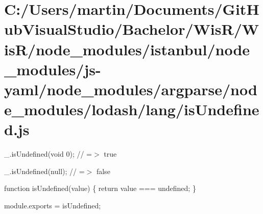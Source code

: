 \hypertarget{_c_1_2_users_2martin_2_documents_2_git_hub_visual_studio_2_bachelor_2_wis_r_2_wis_r_2node_module5b4f1dce1186bdc2e4e8148cbcdc9e7a}{}\section{C\+:/\+Users/martin/\+Documents/\+Git\+Hub\+Visual\+Studio/\+Bachelor/\+Wis\+R/\+Wis\+R/node\+\_\+modules/istanbul/node\+\_\+modules/js-\/yaml/node\+\_\+modules/argparse/node\+\_\+modules/lodash/lang/is\+Undefined.\+js}
\+\_\+.\+is\+Undefined(void 0); // =$>$ true

\+\_\+.\+is\+Undefined(null); // =$>$ false


\begin{DoxyCodeInclude}

\textcolor{keyword}{function} isUndefined(value) \{
  \textcolor{keywordflow}{return} value === undefined;
\}

module.exports = isUndefined;
\end{DoxyCodeInclude}
 